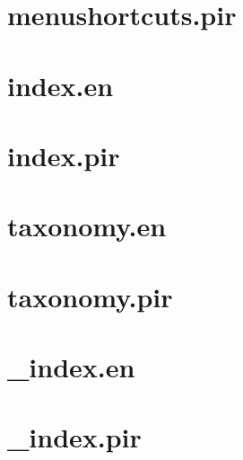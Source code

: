 \let\mypdfximage\pdfximage\def\pdfximage{\immediate\mypdfximage}\documentclass[twoside]{book}
\newcommand{\+}{\discretionary{\mbox{\scriptsize$\hookleftarrow$}}{}{}}
\begin{document}
\chapter{menushortcuts.\+pir}
\label{md_themes_relearn_exampleSite_content_cont_menushortcuts_pir}

\chapter{index.\+en}
\label{md_themes_relearn_exampleSite_content_cont_pages_index_en}

\chapter{index.\+pir}
\label{md_themes_relearn_exampleSite_content_cont_pages_index_pir}

\chapter{taxonomy.\+en}
\label{md_themes_relearn_exampleSite_content_cont_taxonomy_en}

\chapter{taxonomy.\+pir}
\label{md_themes_relearn_exampleSite_content_cont_taxonomy_pir}

\chapter{\+\_\+index.\+en}
\label{md_themes_relearn_exampleSite_content_dev__index_en}

\chapter{\+\_\+index.\+pir}
\label{md_themes_relearn_exampleSite_content_dev__index_pir}

\end{document}
